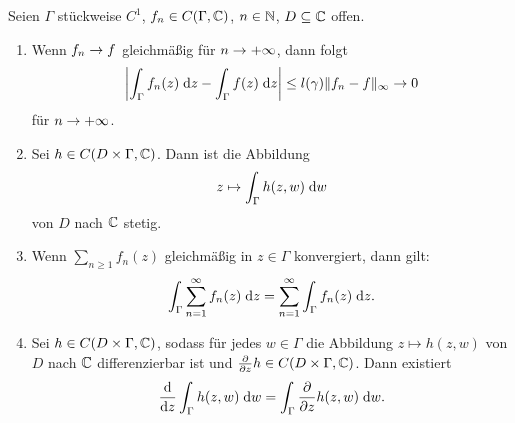 \documentclass[a4paper,twoside,DIV15,BCOR12mm]{scrbook}
\begin{document}
\begin{satz}\label{satz2.7}
Seien $\Gamma$ stückweise $C^1$, $f_n\in C(\Gamma,\mathbb{C})$, $n\in\mathbb{N}$, $D\subseteq\mathbb{C}$ offen.
\begin{enumerate}
\item Wenn $f_n\rightarrow f$ gleichmäßig für $n\rightarrow+\infty$, dann folgt
\[\left|\int_{\Gamma}^{}{f_n(z)}\;\mathrm{d} z-\int_{\Gamma}^{}{f(z)}\;\mathrm{d} z\right| \leq l(\gamma) \|f_n-f\|_\infty\rightarrow 0\]
für $n\rightarrow+\infty$.

\item Sei $h\in C(D\times\Gamma,\mathbb{C})$. Dann ist die Abbildung
\[z\mapsto\int_{\Gamma}^{}{h(z,w)}\;\mathrm{d} w\]
von $D$ nach $\mathbb{C}$ stetig.

\item Wenn $\displaystyle\sum_{n\geq1}f_n(z)$ gleichmäßig in $z\in\Gamma$ konvergiert, dann gilt:
\[\int_{\Gamma}^{}{\sum_{n=1}^\infty f_n(z)}\;\mathrm{d} z = \sum_{n=1}^\infty\int_{\Gamma}^{}{f_n(z)}\;\mathrm{d} z.\]

\item Sei $h\in C(D\times\Gamma,\mathbb{C})$, sodass für jedes $w\in\Gamma$ die Abbildung $z\mapsto h(z,w)$ von $D$ nach $\mathbb{C}$ differenzierbar ist und $\frac{\partial}{\partial z}h\in C(D\times\Gamma,\mathbb{C})$. Dann existiert
\[\frac{\mathrm{d}}{\mathrm{d} z}\int_{\Gamma}^{}{h(z,w)}\;\mathrm{d} w = \int_{\Gamma}^{}{\frac{\partial}{\partial z}h(z,w)}\;\mathrm{d} w.\]
\end{enumerate}
\end{satz}
\end{document}

